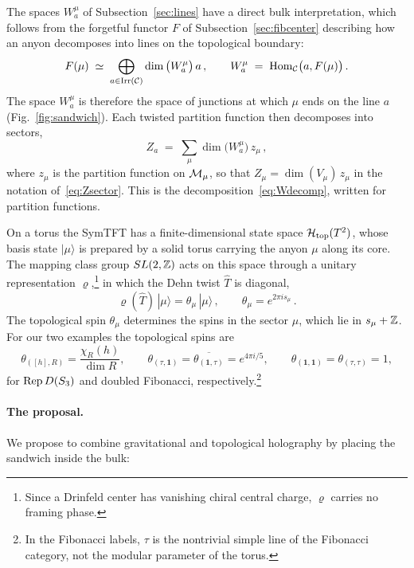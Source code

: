 \documentclass[11pt]{article}
\numberwithin{equation}{section}
\newcommand{\Htop}{\Hil_{\rm top}}
\newcommand{\vr}{\varrho}
\begin{document}
The spaces $W_a^\mu$ of Subsection~\ref{sec:lines} have a direct bulk interpretation, which follows from the forgetful functor $F$ of Subsection~\ref{sec:fibcenter} describing how an anyon decomposes into lines on the topological boundary:
\begin{equation}\label{eq:forget}
F(\mu)\;\simeq\;\bigoplus_{a\in{\rm Irr}(\mathcal C)}\dim\big(W_a^\mu\big)\,a\,,\qquad W_a^\mu\;=\;\mathrm{Hom}_\mathcal C\big(a,F(\mu)\big)\,.
\end{equation}
The space $W_a^\mu$ is therefore the space of junctions at which $\mu$ ends on the line $a$ (Fig.~\ref{fig:sandwich}). Each twisted partition function then decomposes into sectors,
\begin{equation}\label{eq:Za}
Z_a\;=\;\sum_\mu \dim\big(W_a^\mu\big)\,z_\mu\,,
\end{equation}
where $z_\mu$ is the partition function on $\mathcal{M}_\mu$, so that $Z_\mu=\dim(V_\mu)\,z_\mu$ in the notation of~\eqref{eq:Zsector}. This is the decomposition~\eqref{eq:Wdecomp}, written for partition functions.

On a torus the SymTFT has a finite-dimensional state space $\Htop(T^2)$, whose basis state $|\mu\rangle$ is prepared by a solid torus carrying the anyon $\mu$ along its core. The mapping class group $SL(2,\mathbb Z)$ acts on this space through a unitary representation $\vr$,\footnote{Since a Drinfeld center has vanishing chiral central charge, $\vr$ carries no framing phase.} in which the Dehn twist $\hat T$ is diagonal,
\begin{equation}\label{eq:theta}
\vr(\hat T)\,|\mu\rangle=\theta_\mu\,|\mu\rangle\,,\qquad\theta_\mu=e^{2\pi is_\mu}\,.
\end{equation}
The topological spin $\theta_\mu$ determines the spins in the sector $\mu$, which lie in $s_\mu+\mathbb Z$. For our two examples the topological spins are
\begin{equation}\label{eq:spins}
\theta_{([h],R)}=\frac{\chi_R(h)}{\dim R},\qquad\theta_{(\tau,\mathbf 1)}=\overline{\theta_{(\mathbf 1,\tau)}}=e^{4\pi i/5},\qquad\theta_{(\mathbf 1,\mathbf 1)}=\theta_{(\tau,\tau)}=1,
\end{equation}
for $\operatorname{Rep} D(S_3)$ and doubled Fibonacci, respectively.\footnote{In the Fibonacci labels, $\tau$ is the nontrivial simple line of the Fibonacci category, not the modular parameter of the torus.}

\paragraph{The proposal.} We propose to combine gravitational and topological holography by placing the sandwich inside the bulk:
\end{document}
